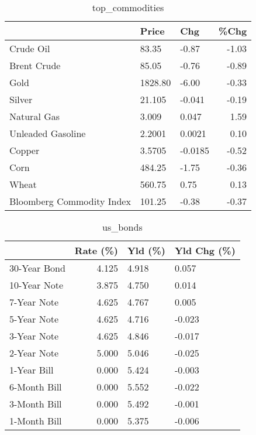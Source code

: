 \documentclass{article}%
\begin{document}
\begin{table}[htbp]%
\caption{top\_commodities}%
\centering%
\begin{adjustbox}{width=1\textwidth}%
\begin{tabular}{lllr}
\toprule
                          &   Price &     Chg &  \%Chg \\
\midrule
               Crude Oil  &   83.35 &   -0.87 & -1.03 \\
             Brent Crude  &   85.05 &   -0.76 & -0.89 \\
                    Gold  & 1828.80 &   -6.00 & -0.33 \\
                  Silver  &  21.105 &  -0.041 & -0.19 \\
             Natural Gas  &   3.009 &   0.047 &  1.59 \\
       Unleaded Gasoline  &  2.2001 &  0.0021 &  0.10 \\
                  Copper  &  3.5705 & -0.0185 & -0.52 \\
                    Corn  &  484.25 &   -1.75 & -0.36 \\
                   Wheat  &  560.75 &    0.75 &  0.13 \\
Bloomberg Commodity Index &  101.25 &   -0.38 & -0.37 \\
\bottomrule
\end{tabular}
%
\end{adjustbox}%
\end{table}

%


\begin{table}[htbp]%
\caption{us\_bonds}%
\centering%
\begin{adjustbox}{width=1\textwidth}%
\begin{tabular}{lrll}
\toprule
             &  Rate (\%) & Yld (\%) & Yld Chg (\%) \\
\midrule
30-Year Bond &     4.125 &   4.918 &       0.057 \\
10-Year Note &     3.875 &   4.750 &       0.014 \\
 7-Year Note &     4.625 &   4.767 &       0.005 \\
 5-Year Note &     4.625 &   4.716 &      -0.023 \\
 3-Year Note &     4.625 &   4.846 &      -0.017 \\
 2-Year Note &     5.000 &   5.046 &      -0.025 \\
 1-Year Bill &     0.000 &   5.424 &      -0.003 \\
6-Month Bill &     0.000 &   5.552 &      -0.022 \\
3-Month Bill &     0.000 &   5.492 &      -0.001 \\
1-Month Bill &     0.000 &   5.375 &      -0.006 \\
\bottomrule
\end{tabular}
%
\end{adjustbox}%
\end{table}
\end{document}
